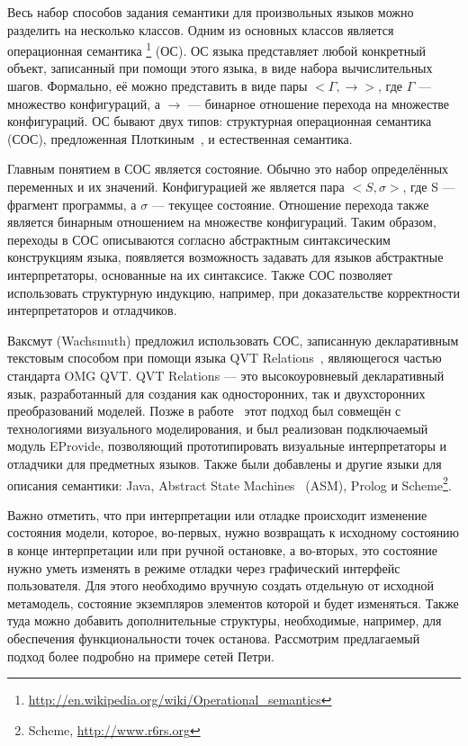 \documentclass[a5paper]{article}
\begin{document}
Весь набор способов задания семантики для произвольных языков можно разделить на несколько классов. Одним из основных классов является операционная семантика \footnote{\url{http://en.wikipedia.org/wiki/Operational_semantics}} (ОС). ОС языка представляет любой конкретный объект, записанный при помощи этого языка, в виде набора вычислительных шагов. Формально, её можно представить в виде пары $<\Gamma, \to>$, где $\Gamma$ — множество конфигураций, а $\to$ — бинарное отношение перехода на множестве конфигураций. ОС бывают двух типов: структурная операционная семантика (СОС), предложенная Плоткиным~\cite{plotkin}, и естественная семантика.

Главным понятием в СОС является состояние. Обычно это набор определённых переменных и их значений. Конфигурацией же является пара $<S, \sigma>$, где S — фрагмент программы, а $\sigma$  — текущее состояние. Отношение перехода также является бинарным отношением на множестве конфигураций. Таким образом, переходы в СОС описываются согласно абстрактным синтаксическим конструкциям языка, появляется возможность задавать для языков абстрактные интерпретаторы, основанные на их синтаксисе. Также СОС позволяет использовать структурную индукцию, например, при доказательстве корректности интерпретаторов и отладчиков.

Ваксмут (Wachsmuth) предложил использовать СОС, записанную декларативным текстовым способом при помощи языка QVT Relations~\cite{qvt}, являющегося частью стандарта OMG QVT. QVT Relations — это высокоуровневый декларативный язык, разработанный для создания как односторонних, так и двухсторонних преобразований моделей. Позже в работе~\cite{wachsmuth1} этот подход был совмещён с технологиями визуального моделирования, и был реализован подключаемый модуль EProvide, позволяющий прототипировать визуальные интерпретаторы и отладчики для предметных языков. Также были добавлены и другие языки для описания семантики: Java, Abstract State Machines~\cite{asm} (ASM), Prolog и Scheme\footnote{Scheme, \url{http://www.r6rs.org}}.

Важно отметить, что при интерпретации или отладке происходит изменение состояния модели, которое, во-первых, нужно возвращать к исходному состоянию в конце интерпретации или при ручной остановке, а во-вторых, это состояние нужно уметь изменять в режиме отладки через графический интерфейс пользователя. Для этого необходимо вручную создать отдельную от исходной метамодель, состояние экземпляров элементов которой и будет изменяться. Также туда можно добавить дополнительные структуры, необходимые, например, для обеспечения функциональности точек останова. Рассмотрим предлагаемый подход более подробно на примере сетей Петри.
\end{document}
